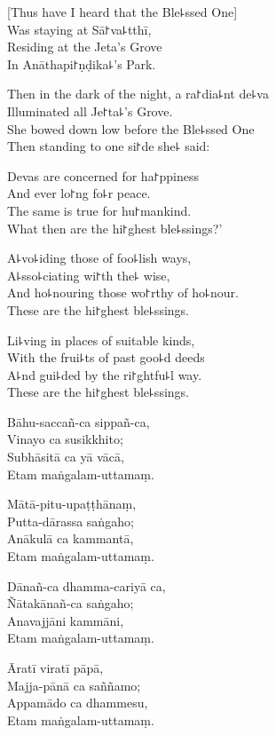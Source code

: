\begin{leader}
\end{leader}

[Thus have I heard that the Ble꜕ssed One]\\
Was staying at Sā꜓va꜕tthī,\\
Residing at the Jeta's Grove\\
In Anāthapi꜓ṇḍika꜕'s Park.

Then in the dark of the night, a ra꜓dia꜕nt de꜕va\\
Illuminated all Je꜓ta꜕'s Grove.\\
She bowed down low before the Ble꜕ssed One\\
Then standing to one si꜓de she꜕ said:

Devas are concerned for ha꜓ppiness\\
And ever lo꜓ng fo꜕r peace.\\
The same is true for hu꜓mankind.\\
What then are the hi꜓ghest ble꜕ssings?'

A꜕vo꜕iding those of foo꜕lish ways,\\
A꜕sso꜕ciating wi꜓th the꜕ wise,\\
And ho꜕nouring those wo꜓rthy of ho꜕nour.\\
These are the hi꜓ghest ble꜕ssings.

Li꜕ving in places of suitable kinds,\\
With the frui꜕ts of past goo꜕d deeds\\
A꜕nd gui꜕ded by the ri꜓ghtfu꜕l way.\\
These are the hi꜓ghest ble꜕ssings.

\clearpage

Bāhu-saccañ-ca sippañ-ca,\\%
Vinayo ca susikkhito;\\
Subhāsitā ca yā vācā,\\
Etam maṅgalam-uttamaṃ.

Mātā-pitu-upaṭṭhānaṃ,\\
Putta-dārassa saṅgaho;\\
Anākulā ca kammantā,\\
Etam maṅgalam-uttamaṃ.

Dānañ-ca dhamma-cariyā ca,\\
Ñātakānañ-ca saṅgaho;\\
Anavajjāni kammāni,\\
Etam maṅgalam-uttamaṃ.

Āratī viratī pāpā,\\
Majja-pānā ca saññamo;\\
Appamādo ca dhammesu,\\
Etam maṅgalam-uttamaṃ.

